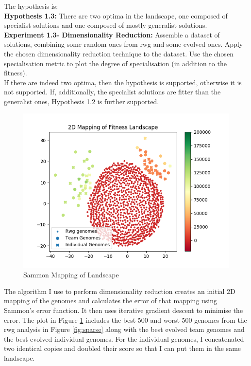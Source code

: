 \documentclass[12pt]{article}
\begin{document}
The hypothesis is:\\

\textbf{Hypothesis 1.3:} There are two optima in the landscape, one composed of specialist solutions and one composed of mostly generalist solutions. \\

\textbf{Experiment 1.3- Dimensionality Reduction:} Assemble a dataset of solutions, combining some random ones from rwg and some evolved ones.
Apply the chosen dimensionality reduction technique to the dataset.
Use the chosen specialisation metric to plot the degree of specialisation (in addition to the fitness).\\

If there are indeed two optima, then the hypothesis is supported, otherwise it is not supported.
If, additionally, the specialist solutions are fitter than the generalist ones, Hypothesis 1.2 is further supported.\\

\begin{figure}[h]
\centering
\includegraphics[width=1.0\textwidth]{sammon.png}
\caption{Sammon Mapping of Landscape}
\label{fig:sammon}
\end{figure}

The algorithm I use to perform dimensionality reduction creates an initial 2D mapping of the genomes and calculates the error of that mapping using Sammon's error function. 
It then uses iterative gradient descent to minimise the error. 
The plot in Figure \ref{fig:sammon} includes the best 500 and worst 500 genomes from the rwg analysis in Figure \ref{fig:sparse} along with the best evolved team genomes and the best evolved individual genomes. 
For the individual genomes, I concatenated two identical copies and doubled their score so that I can put them in the same landscape.\\
\end{document}
